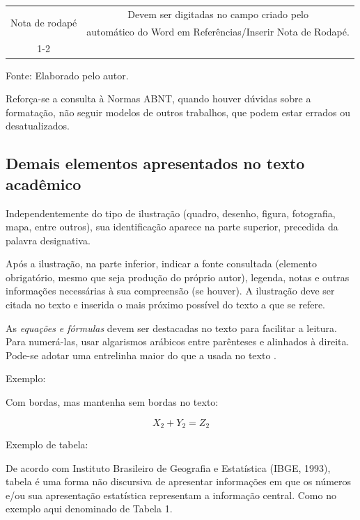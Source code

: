 {\begin{quadro}[htb]
\begin{tabular}{|c|c|}
\multirow{2}{*}{Nota de rodapé} &Devem ser digitadas no campo criado pelo \\
                                &automático do Word em Referências/Inserir Nota de Rodapé.\\ \cline{1-2}         
\end{tabular}

\vspace{0.2 cm}
Fonte: Elaborado pelo autor.

\end{quadro}

Reforça-se a consulta à Normas ABNT, quando houver dúvidas sobre a formatação, não seguir modelos de outros trabalhos, que podem estar errados ou desatualizados.

\subsection{Demais elementos apresentados no texto acadêmico}

Independentemente do tipo de ilustração (quadro, desenho, figura, fotografia, mapa, entre outros), sua identificação aparece na parte superior, precedida da palavra designativa.

\begin{citacao}
Após a ilustração, na parte inferior, indicar a fonte consultada (elemento obrigatório, mesmo que seja produção do próprio autor), legenda, notas e outras informações necessárias à sua compreensão (se houver). A ilustração deve ser citada no texto e inserida o mais próximo possível do texto a que se refere.\cite[p. 11]{ABNT}
\end{citacao}

As \textit{equações e fórmulas} devem ser destacadas no texto para facilitar a leitura. Para numerá-las, usar algarismos arábicos entre parênteses e alinhados à direita. Pode-se adotar uma entrelinha maior do que a usada no texto \cite{ABNT}.

Exemplo: \newline

Com bordas, mas mantenha sem bordas no texto:

\begin{dmath} \label{eq:ModeloEfeitos}
X_{2} + Y_{2} = Z_{2}
\end{dmath}

Exemplo de tabela:

De acordo com Instituto Brasileiro de Geografia e Estatística (IBGE, 1993), tabela é uma forma não discursiva de apresentar informações em que os números e/ou sua apresentação estatística representam a informação central. Como no exemplo aqui denominado de Tabela 1.

}
